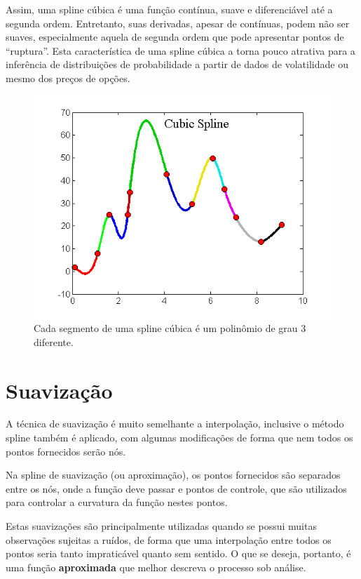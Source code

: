 \documentclass[]{book}
\begin{document}
Assim, uma spline cúbica é uma função contínua, suave e diferenciável
até a segunda ordem. Entretanto, suas derivadas, apesar de contínuas,
podem não ser suaves, especialmente aquela de segunda ordem que pode
apresentar pontos de ``ruptura''. Esta característica de uma spline
cúbica a torna pouco atrativa para a inferência de distribuições de
probabilidade a partir de dados de volatilidade ou mesmo dos preços de
opções.

\begin{figure}
\centering
\includegraphics{./images/cubic_spline.png}
\caption{\label{fig:cubic-spline}Cada segmento de uma spline cúbica é um
polinômio de grau 3 diferente.}
\end{figure}

\section{Suavização}\label{suavizacao}

A técnica de suavização é muito semelhante a interpolação, inclusive o
método spline também é aplicado, com algumas modificações de forma que
nem todos os pontos fornecidos serão nós.

Na spline de suavização (ou aproximação), os pontos fornecidos são
separados entre os nós, onde a função deve passar e pontos de controle,
que são utilizados para controlar a curvatura da função nestes pontos.

Estas suavizações são principalmente utilizadas quando se possui muitas
observações sujeitas a ruídos, de forma que uma interpolação entre todos
os pontos seria tanto impraticável quanto sem sentido. O que se deseja,
portanto, é uma função \textbf{aproximada} que melhor descreva o
processo sob análise.
\end{document}
